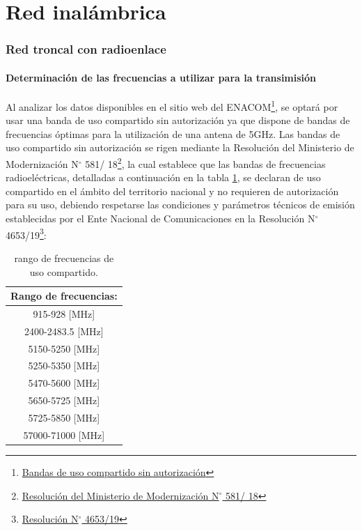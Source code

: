 \documentclass[11pt,a4paper]{article}
\begin{document}
 \clearpage 
\part{Red inalámbrica}



\section{Red troncal con radioenlace}

\subsection{Determinación de las frecuencias a utilizar para la transimisión}

Al analizar los datos disponibles en el sitio web del ENACOM\footnote{\href{https://www.enacom.gob.ar/bandas-de-uso-compartido-sin-autorizacion_p680}{Bandas de uso compartido sin autorización}}, se optará por usar una banda de uso compartido sin autorización ya que dispone de bandas de frecuencias óptimas para la utilización de una antena de 5GHz. 
Las bandas de uso compartido sin autorización se rigen mediante la Resolución del Ministerio de Modernización N$\mathrm{{}^\circ}$ 581/ 18\footnote{\href{https://www.argentina.gob.ar/normativa/nacional/resolución-581-2018-314174}{Resolución del Ministerio de Modernización N$\mathrm{{}^\circ}$ 581/ 18}}, la cual establece que las bandas de frecuencias radioeléctricas, detalladas a continuación en la tabla \ref{tab:frec_libres}, se declaran de uso compartido en el ámbito del territorio nacional y no requieren de autorización para su uso, debiendo respetarse las condiciones y parámetros técnicos de emisión establecidas por el Ente Nacional de Comunicaciones en la Resolución N$\mathrm{{}^\circ}$ 4653/19\footnote{\href{https://www.enacom.gob.ar/multimedia/normativas/2019/res4653.pdf}{Resolución N$\mathrm{{}^\circ}$ 4653/19}}:

\begin{table}[htbp]
  \centering
\begin{tabular}{|c|} \hline 
Rango de frecuencias: \\ \hline 
915-928 [MHz] \\ \hline 
2400-2483.5 [MHz] \\ \hline 
5150-5250 [MHz] \\ \hline 
5250-5350 [MHz] \\ \hline 
5470-5600 [MHz] \\ \hline 
5650-5725 [MHz] \\ \hline 
5725-5850 [MHz] \\ \hline 
57000-71000 [MHz] \\ \hline
\end{tabular}
\caption{rango de frecuencias de uso compartido.}
\label{tab:frec_libres}
\end{table}%
\end{document}
